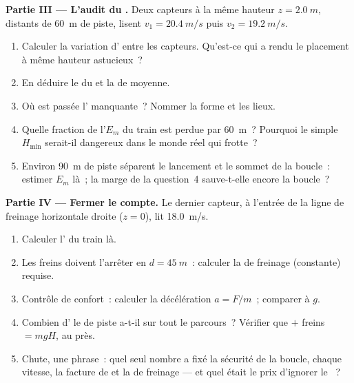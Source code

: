 \begin{problem}
\medskip
\noindent\textbf{Partie III --- L'audit du
.}
Deux capteurs à la même hauteur $z = \qty{2.0}{m}$, distants de
\qty{60}{m} de piste, lisent $v_1 = \qty{20.4}{m/s}$ puis
$v_2 = \qty{19.2}{m/s}$.
\begin{enumerate}[resume]
  \item Calculer la variation d'
         entre les
        capteurs. Qu'est-ce qui a rendu le placement à même hauteur
        astucieux~?
  \item En déduire le  du
         et la
         de
         moyenne.
  \item Où est passée l'
        manquante~? Nommer la forme et les lieux.
  \item Quelle fraction de l'$E_m$ du train est perdue par
        \qty{60}{m}~? Pourquoi le simple $H_{\min}$ serait-il dangereux
        dans le monde réel qui frotte~?
  \item Environ \qty{90}{m} de piste séparent le lancement et le sommet
        de la boucle~: estimer $E_m$ là~; la marge de la question~4
        sauve-t-elle encore la boucle~?
\end{enumerate}

\medskip
\noindent\textbf{Partie IV --- Fermer le compte.}
Le dernier capteur, à l'entrée de la ligne de freinage horizontale
droite ($z = 0$), lit \qty{18.0}{m/s}.
\begin{enumerate}[resume]
  \item Calculer l' du train là.
  \item Les freins doivent l'arrêter en $d = \qty{45}{m}$~: calculer
        la  de freinage (constante)
        requise.
  \item Contrôle de confort~: calculer la décélération $a = F/m$~;
        comparer à $g$.
  \item Combien d' le
         de piste a-t-il
         sur tout le parcours~? Vérifier que
         $+$ freins $= mgH$,
        au  près.
  \item Chute, une phrase~: quel seul nombre a fixé la sécurité de la
        boucle, chaque vitesse, la facture de
         et la
         de freinage --- et quel
        était le prix d'ignorer le
        ~?
\end{enumerate}
\end{problem}

